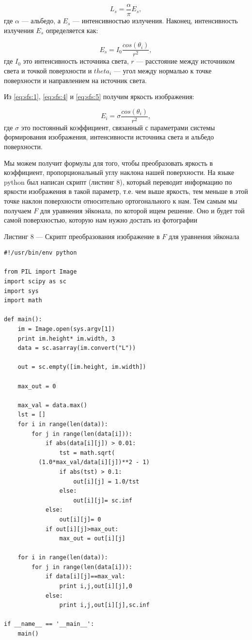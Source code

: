 \begin{equation}
  \label{eq:sfs:4}
  L_s=\frac{\alpha}{\pi}E_s,
\end{equation}
где $\alpha$ --- альбедо, а $E_s$ --- интенсивностью
излучения. Наконец, интенсивность излучения $E_s$ определяется как:

\begin{equation}
  \label{eq:sfs:5}
  E_s = I_0\frac{cos(\theta_i)}{r^2},
\end{equation}
где $I_0$ это интенсивность источника света, $r$ --- расстояние между
источником света и точкой поверхности и $theta_i$ --- угол между
нормалью к точке поверхности и направлением на источник света.

Из \eqref{eq:sfs:1}, \eqref{eq:sfs:4} и \eqref{eq:sfs:5} получим яркость
изображения:

\begin{equation}
  \label{eq:sfs:6}
  E_i = \sigma\frac{cos(\theta_i)}{r^2},
\end{equation}
где $\sigma$ это постоянный коэффициент, связанный с параметрами
системы формирования изображения, интенсивности источника света и
альбедо поверхности.

Мы можем получит формулы для того, чтобы преобразовать яркость в
коэффициент, пропорциональный углу наклона нашей поверхности.  На
языке python был написан скрипт (листинг 8), который переводит
информацию по яркости изображения в такой параметр, т.е. чем выше
яркость, тем меньше в этой точке наклон поверхности относительно
ортогонального к нам. Тем самым мы получаем $F$ для уравнения
эйконала, по которой ищем решение. Оно и будет той самой поверхностью,
которую нам нужно достать из фотографии

\vspace{1em} Листинг 8 --- Скрипт преобразования изображение в $F$ для
уравнения эйконала \normalsize
\begin{verbatim}
#!/usr/bin/env python

from PIL import Image
import scipy as sc
import sys
import math

def main():
    im = Image.open(sys.argv[1])
    print im.height* im.width, 3
    data = sc.asarray(im.convert("L"))

    out = sc.empty([im.height, im.width])

    max_out = 0
    
    max_val = data.max()
    lst = []
    for i in range(len(data)):
        for j in range(len(data[i])):
            if abs(data[i][j]) > 0.01:
                tst = math.sqrt(
          (1.0*max_val/data[i][j])**2 - 1)
                if abs(tst) > 0.1:
                    out[i][j] = 1.0/tst
                else:
                    out[i][j]= sc.inf
            else:
                out[i][j]= 0
            if out[i][j]>max_out:
                max_out = out[i][j]

    for i in range(len(data)):
        for j in range(len(data[i])):
            if data[i][j]==max_val:
                print i,j,out[i][j],0
            else:
                print i,j,out[i][j],sc.inf

if __name__ == '__main__':
    main()
\end{verbatim}
\large

